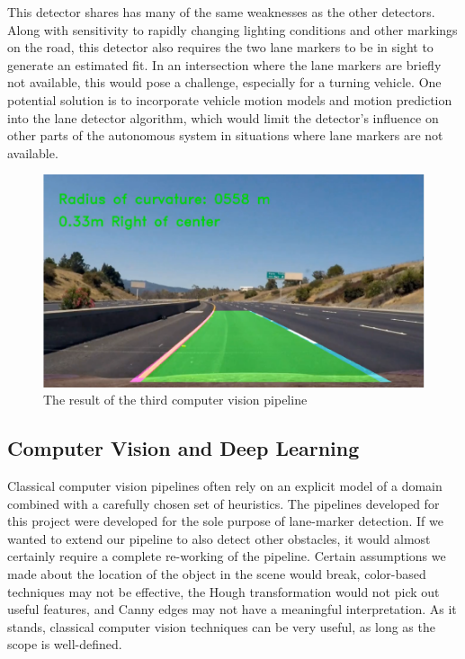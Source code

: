 \documentclass[conf]{new-aiaa}
\begin{document}
This detector shares has many of the same weaknesses as the other detectors.  Along with sensitivity to rapidly changing lighting conditions and other markings on the road, this detector also requires the two lane markers to be in sight to generate an estimated fit.  In an intersection where the lane markers are briefly not available, this would pose a challenge, especially for a turning vehicle.  One potential solution is to incorporate vehicle motion models and motion prediction into the lane detector algorithm, which would limit the detector's influence on other parts of the autonomous system in situations where lane markers are not available.

\begin{figure}[h!]
    \centering
    \includegraphics[scale = 0.65]{"./images/advanced_final"}
    \caption{The result of the third computer vision pipeline}
    \label{fig:advanced_final}
\end{figure}

\subsection{Computer Vision and Deep Learning}
Classical computer vision pipelines often rely on an explicit model of a domain combined with a carefully chosen set of heuristics.  The pipelines developed for this project were developed for the sole purpose of lane-marker detection.  If we wanted to extend our pipeline to also detect other obstacles, it would almost certainly require a complete re-working of the pipeline.  Certain assumptions we made about the location of the object in the scene would break, color-based techniques may not be effective, the Hough transformation would not pick out useful features, and Canny edges may not have a meaningful interpretation.  As it stands, classical computer vision techniques can be very useful, as long as the scope is well-defined.
\end{document}

